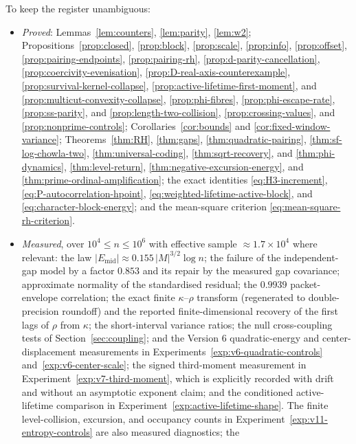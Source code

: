 \documentclass[11pt]{amsart}
\numberwithin{equation}{section}
\theoremstyle{plain}
\theoremstyle{definition}
\theoremstyle{remark}
\newcommand{\Mert}{M}
\begin{document}
To keep the register unambiguous:
\begin{itemize}[leftmargin=1.6em]
\item \emph{Proved}: Lemmas~\ref{lem:counters}, \ref{lem:parity}, \ref{lem:w2};
Propositions~\ref{prop:closed}, \ref{prop:block}, \ref{prop:scale},
\ref{prop:info}, \ref{prop:offset}, \ref{prop:pairing-endpoints},
\ref{prop:pairing-rh}, \ref{prop:d-parity-cancellation},
\ref{prop:coercivity-evenisation}, \ref{prop:D-real-axis-counterexample},
\ref{prop:survival-kernel-collapse}, \ref{prop:active-lifetime-first-moment},
and \ref{prop:multicut-convexity-collapse}, \ref{prop:phi-fibres},
\ref{prop:phi-escape-rate}, \ref{prop:ss-parity}, and
\ref{prop:length-two-collision}, \ref{prop:crossing-values}, and
\ref{prop:nonprime-controls}; Corollaries~\ref{cor:bounds} and
\ref{cor:fixed-window-variance}; Theorems~\ref{thm:RH}, \ref{thm:gaps},
\ref{thm:quadratic-pairing}, \ref{thm:sf-log-chowla-two},
\ref{thm:universal-coding}, \ref{thm:sqrt-recovery}, and
\ref{thm:phi-dynamics}, \ref{thm:level-return},
\ref{thm:negative-excursion-energy}, and
\ref{thm:prime-ordinal-amplification}; the exact
identities \eqref{eq:H3-increment}, \eqref{eq:P-autocorrelation-hpoint},
\eqref{eq:weighted-lifetime-active-block}, and
\eqref{eq:character-block-energy}; and the mean-square criterion
\eqref{eq:mean-square-rh-criterion}.
\item \emph{Measured}, over $10^{4}\le n\le10^{6}$ with effective sample
$\approx1.7\times10^{4}$ where relevant: the law
$|E_{\mathrm{mid}}|\approx0.155\,|\Mert|^{3/2}\log n$; the failure of the
independent-gap model by a factor $0.853$ and its repair by the measured gap
covariance; approximate normality of the standardised residual; the
$0.9939$ packet-envelope correlation; the exact finite $\kappa$--$\rho$ transform (regenerated to double-precision
roundoff) and the reported finite-dimensional recovery of the first lags of $\rho$
from $\kappa$; the short-interval variance ratios; the
null cross-coupling tests of Section~\ref{sec:coupling}; and the Version 6
quadratic-energy and center-displacement measurements in
Experiments~\ref{exp:v6-quadratic-controls} and~\ref{exp:v6-center-scale};
the signed third-moment measurement in Experiment~\ref{exp:v7-third-moment},
which is explicitly recorded with drift and without an asymptotic exponent claim;
and the conditioned active-lifetime comparison in
Experiment~\ref{exp:active-lifetime-shape}.
The finite level-collision, excursion, and occupancy counts in
Experiment~\ref{exp:v11-entropy-controls} are also measured diagnostics; the

\end{itemize}
\end{document}

